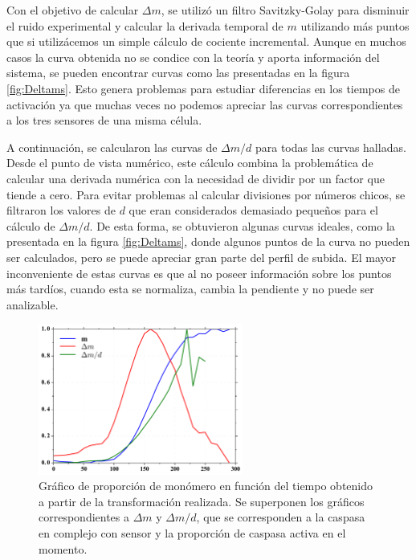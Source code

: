 Con el objetivo de calcular $\Delta m$, se utilizó un filtro Savitzky-Golay para disminuir el ruido experimental y calcular la derivada temporal de $m$ utilizando más puntos que si utilizácemos un simple cálculo de cociente incremental. Aunque en muchos casos la curva obtenida no se condice con la teoría y aporta información del sistema, se pueden encontrar curvas como las presentadas en la figura \ref{fig:Deltams}. Esto genera problemas para estudiar diferencias en los tiempos de activación ya que muchas veces no podemos apreciar las curvas correspondientes a los tres sensores de una misma célula.

A continuación, se calcularon las curvas de $\Delta m/d$ para todas las curvas halladas. Desde el punto de vista numérico, este cálculo combina la problemática de calcular una derivada numérica con la necesidad de dividir por un factor que tiende a cero. Para evitar problemas al calcular divisiones por números chicos, se filtraron los valores de $d$ que eran considerados demasiado pequeños para el cálculo de $\Delta m/d$. De esta forma, se obtuvieron algunas curvas ideales, como la presentada en la figura \ref{fig:Deltams}, donde algunos puntos de la curva no pueden ser calculados, pero se puede apreciar gran parte del perfil de subida. El mayor inconveniente de estas curvas es que al no poseer información sobre los puntos más tardíos, cuando esta se normaliza, cambia la pendiente y no puede ser analizable.

\begin{figure}
    \centering
    \includegraphics[width=0.6\textwidth]{./img/Cap4/Deltams.png}
    \caption{Gráfico de proporción de monómero en función del tiempo obtenido a partir de la transformación realizada. Se superponen los gráficos correspondientes a $\Delta m$ y $\Delta m/d$, que se corresponden a la caspasa en complejo con sensor y la proporción de caspasa activa en el momento.}
    \label{fig:m}
\end{figure}

